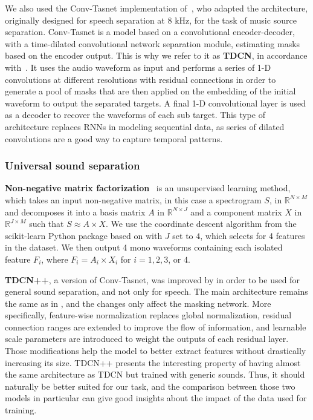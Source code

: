 \documentclass{article}
\begin{document}
			We also used the Conv-Tasnet\cite{tdcn} implementation of~\cite{demucs}, who adapted the architecture, originally designed for speech separation at 8 kHz, for the task of music source separation. Conv-Tasnet is a model based on a convolutional encoder-decoder, with a time-dilated convolutional network separation module, estimating masks based on the encoder output. This is why we refer to it as \textbf{TDCN}, in accordance with~\cite{tdcnpp}. It uses the audio waveform as input and performs a series of 1-D convolutions at different resolutions with residual connections in order to generate a pool of masks that are then applied on the embedding of the initial waveform to output the separated targets. A final 1-D convolutional layer is used as a decoder to recover the waveforms of each sub target. This type of architecture replaces RNNs in modeling sequential data, as series of dilated convolutions are a good way to capture temporal patterns.
			
			\subsubsection{Universal sound separation}
			\textbf{Non-negative matrix factorization}~\cite{Cichocki_NMF, Fevotte_NMF} is an unsupervised learning method, which takes an input non-negative matrix, in this case a spectrogram $S$, in $\mathbb{R} ^{N\times M}$ and decomposes it into a basis matrix $A$ in $\mathbb{R}^{N\times J}$ and a component matrix $X$ in $\mathbb{R}^{J\times M}$ such that $S\approx A\times X$. We use the coordinate descent algorithm from the scikit-learn Python package based on \cite{Cichocki_NMF} with $J$ set to $4$, which selects for 4 features in the dataset. We then output 4 mono waveforms containing each isolated feature $F_i$, where $F_i=A_i\times X_i$ for $i = 1, 2, 3$, or $4$.

			\textbf{TDCN++}, a version of Conv-Tasnet, was improved by \cite{tdcnpp} in order to be used for general sound separation, and not only for speech. The main architecture remains the same as in \cite{tdcn}, and the changes only affect the masking network. More specifically, feature-wise normalization replaces global normalization, residual connection ranges are extended to improve the flow of information, and learnable scale parameters are introduced to weight the outputs of each residual layer. Those modifications help the model to better extract features without drastically increasing its size.
			TDCN++ presents the interesting property of having almost the same architecture as TDCN but trained with generic sounds. Thus, it should naturally be better suited for our task, and the comparison between those two models in particular can give good insights about the impact of the data used for training.
	
\end{document}
